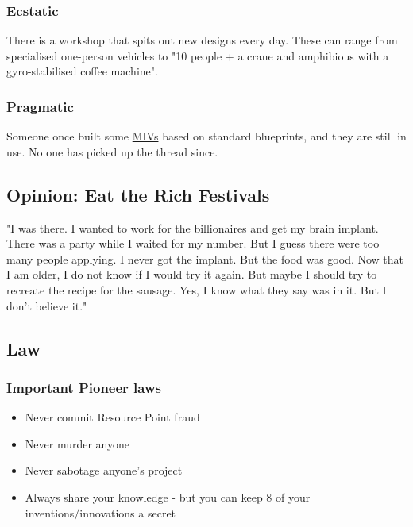 \subsubsection{Ecstatic}

There is a workshop that spits out new designs every day. These can range from specialised one-person vehicles to "10 people + a crane and amphibious with a gyro-stabilised coffee machine".

\subsubsection{Pragmatic}

Someone once built some \hyperref[sec:MIV]{MIVs} based on standard blueprints, and they are still in use. No one has picked up the thread since.

\subsection{Opinion: Eat the Rich Festivals}

"I was there. I wanted to work for the billionaires and get my brain implant. There was a party while I waited for my number. But I guess there were too many people applying. I never got the implant. But the food was good. Now that I am older, I do not know if I would try it again. But maybe I should try to recreate the recipe for the sausage. Yes, I know what they say was in it. But I don't believe it."

\subsection{Law}
\label{sec: pioneer law}

\subsubsection{Important Pioneer laws}

\begin{itemize}
\item{Never commit Resource Point fraud}
\item{Never murder anyone}
\item{Never sabotage anyone's project}
\item{Always share your knowledge - but you can keep 8 of your inventions/innovations a secret}   %
\end{itemize}

